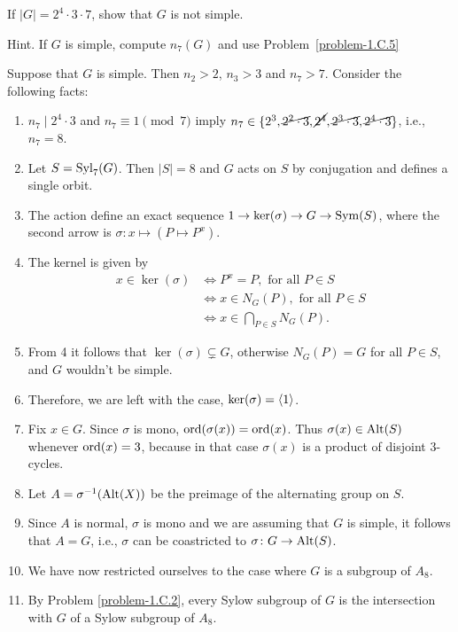 \begin{probl}
    If\/ $|G|=2^4\cdot3\cdot7$, show that\/ $G$ is not simple.

    \textrm{\upshape Hint. If $G$ is simple, compute $n_7(G)$ and use Problem~\ref{problem-1.C.5}}
\end{probl}

\begin{solution} Suppose that $G$ is simple. Then $n_2>2$, $n_3>3$ and $n_7>7$. Consider the following facts:
\begin{enumerate}[\upshape1.]
    \item $n_7\mid2^4\cdot3$ and $n_7\equiv1\pmod7$ imply $n_7\in\{2^3, \cancel{2^2\cdot3}, \cancel{2^4}, \cancel{2^3\cdot3}, \cancel{2^4\cdot3}\}$, i.e., $n_7=8$.
    \item Let $S={\rm Syl}_7(G)$. Then $|S|=8$ and $G$ acts on $S$ by conjugation and defines a single orbit.
    \item The action define an exact sequence $1\to\ker(\sigma)\to G\to{\rm Sym}(S)$, where the second arrow is $\sigma\colon x\mapsto(P\mapsto P^x)$.
    \item The kernel is given by
    \begin{align*}
        x\in\ker(\sigma) &\iff P^x=P, \text{ for all }P\in S\\
            &\iff x\in N_G(P), \text{ for all }P\in S\\
            &\iff x\in\bigcap_{P\in S}N_G(P).
    \end{align*}
    \item From 4 it follows that $\ker(\sigma)\varsubsetneq G$, otherwise $N_G(P)=G$ for all $P\in S$, and $G$ wouldn't be simple.
    \item Therefore, we are left with the case, $\ker(\sigma)=\langle1\rangle$.
    \item Fix $x\in G$. Since $\sigma$ is mono, ${\rm ord}(\sigma(x))={\rm ord}(x)$. Thus $\sigma(x)\in {\rm Alt}(S)$ whenever ${\rm ord}(x)=3$, because in that case $\sigma(x)$ is a product of disjoint $3$-cycles.
    \item Let $A=\sigma^{-1}({\rm Alt}(X))$ be the preimage of the alternating group on $S$.
    \item Since $A$ is normal, $\sigma$ is mono and we are assuming that $G$ is simple, it follows that $A=G$, i.e., $\sigma$ can be coastricted to $\sigma\colon G\to{\rm Alt}(S)$.
    \item We have now restricted ourselves to the case where $G$ is a subgroup of $A_8$.
    \item By Problem \ref{problem-1.C.2}, every Sylow subgroup of $G$ is the intersection with $G$ of a Sylow subgroup of $A_8$.

\end{enumerate}
\end{solution}
